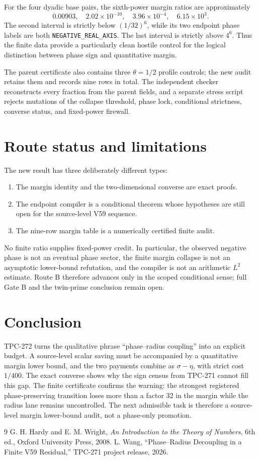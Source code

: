 \documentclass[11pt]{article}
\begin{document}
For the four dyadic base pairs, the sixth-power margin ratios are approximately
\[
 0.00903,\quad 2.02\times10^{-10},\quad 3.96\times10^{-4},
 \quad 6.15\times10^3.
\]
The second interval is strictly below \((1/32)^6\), while its two endpoint
phase labels are both \texttt{NEGATIVE\_REAL\_AXIS}.  The last interval is
strictly above \(4^6\).  Thus the finite data provide a particularly clean hostile
control for the logical distinction between phase sign and quantitative
margin.

The parent certificate also contains three \(\theta=1/2\) profile controls;
the new audit retains them and records nine rows in total.  The independent
checker reconstructs every fraction from the parent fields, and a separate
stress script rejects mutations of the collapse threshold, phase lock,
conditional strictness, converse status, and fixed-power firewall.

\section{Route status and limitations}

The new result has three deliberately different types:

\begin{enumerate}
\item The margin identity and the two-dimensional converse are exact proofs.
\item The endpoint compiler is a conditional theorem whose hypotheses are
      still open for the source-level V59 sequence.
\item The nine-row margin table is a numerically certified finite audit.
\end{enumerate}

No finite ratio supplies fixed-power credit.  In particular, the observed
negative phase is not an eventual phase sector, the finite margin collapse is
not an asymptotic lower-bound refutation, and the compiler is not an
arithmetic \(L^2\) estimate.  Route B therefore advances only in the scoped
conditional sense; full Gate B and the twin-prime conclusion remain open.

\section{Conclusion}

TPC-272 turns the qualitative phrase ``phase--radius coupling'' into an
explicit budget.  A source-level scalar saving must be accompanied by a
quantitative margin lower bound, and the two payments combine as
\(\sigma-\eta\), with strict cost \(1/400\).  The exact converse shows why
the sign census from TPC-271 cannot fill this gap.  The finite certificate
confirms the warning: the strongest registered phase-preserving transition
loses more than a factor 32 in the margin while the radius lane remains
uncontrolled.  The next admissible task is therefore a source-level margin
lower-bound audit, not a phase-only promotion.

\begin{thebibliography}{9}
G. H. Hardy and E. M. Wright, \emph{An Introduction to the Theory of Numbers},
6th ed., Oxford University Press, 2008.
L. Wang, ``Phase--Radius Decoupling in a Finite V59 Residual,'' TPC-271
project release, 2026.
\end{thebibliography}
\end{document}

